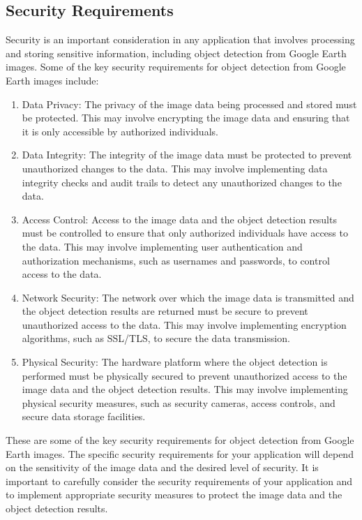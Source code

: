	\subsection{Security Requirements}
	Security is an important consideration in any application that involves processing and storing sensitive information, including object detection from Google Earth images. Some of the key security requirements for object detection from Google Earth images include:
	
	\begin{enumerate}
		\item Data Privacy: The privacy of the image data being processed and stored must be protected. This may involve encrypting the image data and ensuring that it is only accessible by authorized individuals.
		\item Data Integrity: The integrity of the image data must be protected to prevent unauthorized changes to the data. This may involve implementing data integrity checks and audit trails to detect any unauthorized changes to the data.
		\item Access Control: Access to the image data and the object detection results must be controlled to ensure that only authorized individuals have access to the data. This may involve implementing user authentication and authorization mechanisms, such as usernames and passwords, to control access to the data.
		\item Network Security: The network over which the image data is transmitted and the object detection results are returned must be secure to prevent unauthorized access to the data. This may involve implementing encryption algorithms, such as SSL/TLS, to secure the data transmission.
		\item Physical Security: The hardware platform where the object detection is performed must be physically secured to prevent unauthorized access to the image data and the object detection results. This may involve implementing physical security measures, such as security cameras, access controls, and secure data storage facilities.
		
	\end{enumerate}
These are some of the key security requirements for object detection from Google Earth images. The specific security requirements for your application will depend on the sensitivity of the image data and the desired level of security. It is important to carefully consider the security requirements of your application and to implement appropriate security measures to protect the image data and the object detection results.


